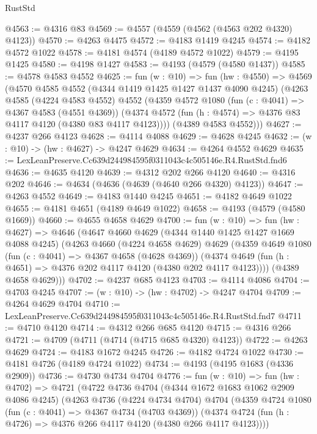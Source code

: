 \begin{lexlean}{RustStd}
\begin{coremodule}
@4563 := @4316 @83
@4569 := @4557 (@4559 (@4562 (@4563 @202 @4320) @4123))
@4570 := @4263 @4475
@4572 := @4183 @1419 @4245
@4574 := @4182 @4572 @1022
@4578 := @4181 @4574 (@4189 @4572 @1022)
@4579 := @4195 @1425
@4580 := @4198 @1427
@4583 := @4193 (@4579 (@4580 @1437))
@4585 := @4578 @4583 @4552
@4625 := fun (w : @10) =>
  fun (hw : @4550) =>
  @4569
    (@4570
      @4585
      @4552
      (@4344 @1419 @1425 @1427 @1437 @4090 @4245)
      (@4263
        @4585
        (@4224 @4583 @4552)
        @4552
        (@4359
          @4572
          @1080
          (fun (c : @4041) => @4367 @4583 (@4551 @4369))
          (@4374 @4572 (fun (h : @4574) => @4376 @83 @4117 @4120 (@4380 @83 @4117 @4123))))
        (@4389 @4583 @4552)))
@4627 := @4237 @266 @4123
@4628 := @4114 @4088
@4629 := @4628 @4245
@4632 := (w : @10) -> (hw : @4627) -> @4247 @4629
@4634 := @4264 @4552 @4629
@4635 := LexLeanPreserve.Cc639d244984595f0311043c4c505146e.R4.RustStd.fnd6
@4636 := @4635 @4120
@4639 := @4312 @202 @266 @4120
@4640 := @4316 @202
@4646 := @4634 (@4636 (@4639 (@4640 @266 @4320) @4123))
@4647 := @4263 @4552
@4649 := @4183 @1440 @4245
@4651 := @4182 @4649 @1022
@4655 := @4181 @4651 (@4189 @4649 @1022)
@4658 := @4193 (@4579 (@4580 @1669))
@4660 := @4655 @4658 @4629
@4700 := fun (w : @10) =>
  fun (hw : @4627) =>
  @4646
    (@4647
      @4660
      @4629
      (@4344 @1440 @1425 @1427 @1669 @4088 @4245)
      (@4263
        @4660
        (@4224 @4658 @4629)
        @4629
        (@4359
          @4649
          @1080
          (fun (c : @4041) => @4367 @4658 (@4628 @4369))
          (@4374 @4649 (fun (h : @4651) => @4376 @202 @4117 @4120 (@4380 @202 @4117 @4123))))
        (@4389 @4658 @4629)))
@4702 := @4237 @685 @4123
@4703 := @4114 @4086
@4704 := @4703 @4245
@4707 := (w : @10) -> (hw : @4702) -> @4247 @4704
@4709 := @4264 @4629 @4704
@4710 := LexLeanPreserve.Cc639d244984595f0311043c4c505146e.R4.RustStd.fnd7
@4711 := @4710 @4120
@4714 := @4312 @266 @685 @4120
@4715 := @4316 @266
@4721 := @4709 (@4711 (@4714 (@4715 @685 @4320) @4123))
@4722 := @4263 @4629
@4724 := @4183 @1672 @4245
@4726 := @4182 @4724 @1022
@4730 := @4181 @4726 (@4189 @4724 @1022)
@4734 := @4193 (@4195 @1683 (@4336 @2909))
@4736 := @4730 @4734 @4704
@4776 := fun (w : @10) =>
  fun (hw : @4702) =>
  @4721
    (@4722
      @4736
      @4704
      (@4344 @1672 @1683 @1062 @2909 @4086 @4245)
      (@4263
        @4736
        (@4224 @4734 @4704)
        @4704
        (@4359
          @4724
          @1080
          (fun (c : @4041) => @4367 @4734 (@4703 @4369))
          (@4374 @4724 (fun (h : @4726) => @4376 @266 @4117 @4120 (@4380 @266 @4117 @4123))))

\end{coremodule}
\end{lexlean}
